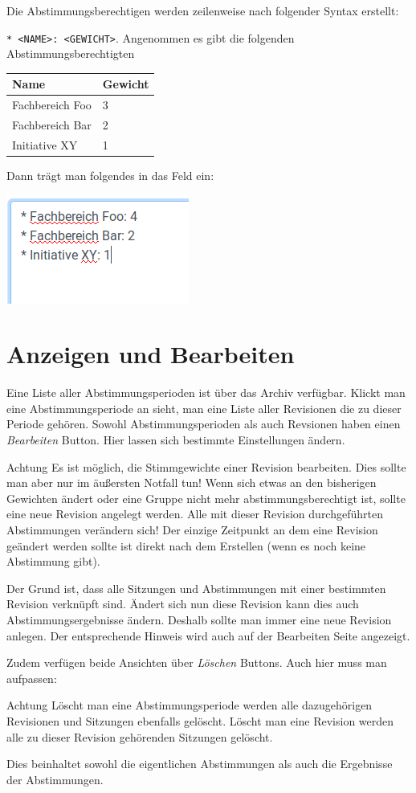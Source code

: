 Die Abstimmungsberechtigen werden zeilenweise nach folgender Syntax erstellt:

\texttt{* <NAME>: <GEWICHT>}.
Angenommen es gibt die folgenden Abstimmungsberechtigten

\begin{center}
\begin{tabular}{@{}ll@{}}
\toprule
  Name & Gewicht\\ \midrule
  Fachbereich Foo & 3 \\
  Fachbereich Bar & 2 \\
  Initiative XY & 1 \\
\bottomrule
\end{tabular}
\end{center}

Dann trägt man folgendes in das Feld ein:

\includegraphics{../images/voters_revision}

\section*{Anzeigen und Bearbeiten}
Eine Liste aller Abstimmungsperioden ist über das Archiv verfügbar.
Klickt man eine Abstimmungsperiode an sieht, man eine Liste aller
Revisionen die zu dieser Periode gehören.
Sowohl Abstimmungsperioden als auch Revsionen haben einen \emph{Bearbeiten}
Button.
Hier lassen sich bestimmte Einstellungen ändern.
\begin{importantbox}{Achtung}
Es ist möglich, die Stimmgewichte einer Revision bearbeiten.
Dies sollte man aber nur im äußersten Notfall tun!
Wenn sich etwas an den bisherigen Gewichten ändert oder eine Gruppe nicht mehr
abstimmungsberechtigt ist, sollte eine neue Revision angelegt werden.
Alle mit dieser Revision durchgeführten Abstimmungen verändern sich!
Der einzige Zeitpunkt an dem eine Revision geändert werden sollte ist direkt
nach dem Erstellen (wenn es noch keine Abstimmung gibt).
\end{importantbox}
Der Grund ist, dass alle Sitzungen und Abstimmungen mit einer bestimmten Revision
verknüpft sind.
Ändert sich nun diese Revision kann dies auch Abstimmungsergebnisse ändern.
Deshalb sollte man immer eine neue Revision anlegen.
Der entsprechende Hinweis wird auch auf der Bearbeiten Seite angezeigt.

Zudem verfügen beide Ansichten über \emph{Löschen} Buttons.
Auch hier muss man aufpassen:
\begin{importantbox}{Achtung}
Löscht man eine Abstimmungsperiode werden alle dazugehörigen Revisionen und
Sitzungen ebenfalls gelöscht.
Löscht man eine Revision werden alle zu dieser Revision gehörenden Sitzungen
gelöscht.

Dies beinhaltet sowohl die eigentlichen Abstimmungen als auch die Ergebnisse
der Abstimmungen.
\end{importantbox}
